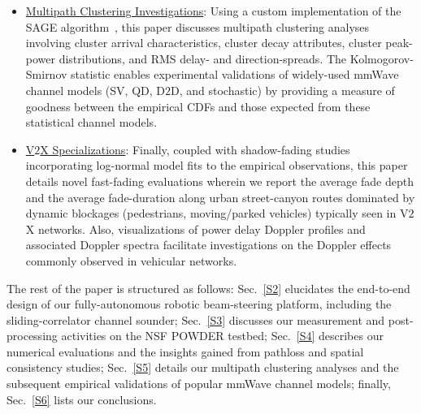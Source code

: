 \documentclass[12pt, draftcls, onecolumn]{IEEEtran}
\begin{document}
\begin{itemize}[leftmargin=*]
    \item \underline{Multipath Clustering Investigations}: Using a custom implementation of the SAGE algorithm~\cite{SAGE}, this paper discusses multipath clustering analyses involving cluster arrival characteristics, cluster decay attributes, cluster peak-power distributions, and RMS delay- and direction-spreads. The Kolmogorov-Smirnov statistic enables experimental validations of widely-used mmWave channel models (SV, QD, D$2$D, and stochastic) by providing a measure of goodness between the empirical CDFs and those expected from these statistical channel models.
    \item \underline{V$2$X Specializations}: Finally, coupled with shadow-fading studies incorporating log-normal model fits to the empirical observations, this paper details novel fast-fading evaluations wherein we report the average fade depth and the average fade-duration along urban street-canyon routes dominated by dynamic blockages (pedestrians, moving/parked vehicles) typically seen in V$2$X networks. Also, visualizations of power delay Doppler profiles and associated Doppler spectra facilitate investigations on the Doppler effects commonly observed in vehicular networks.
\end{itemize}

The rest of the paper is structured as follows: Sec.~\ref{S2} elucidates the end-to-end design of our fully-autonomous robotic beam-steering platform, including the sliding-correlator channel sounder; Sec.~\ref{S3} discusses our measurement and post-processing activities on the NSF POWDER testbed; Sec.~\ref{S4} describes our numerical evaluations and the insights gained from pathloss and spatial consistency studies; Sec.~\ref{S5} details our multipath clustering analyses and the subsequent empirical validations of popular mmWave channel models; finally, Sec.~\ref{S6} lists our conclusions.
\vspace{-4mm}

\end{document}

